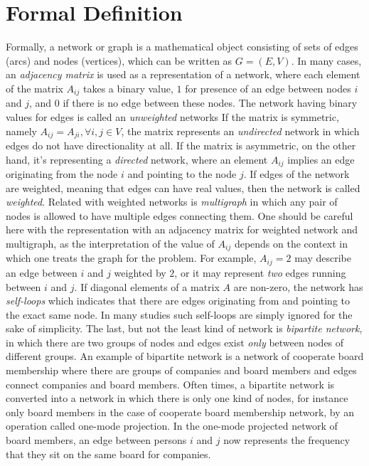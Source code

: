 \section*{Formal Definition}
	Formally, a network or graph is a mathematical object consisting of sets of edges (arcs) and nodes (vertices), which can be written as $G = (E,V)$. In many cases, an \textit{adjacency matrix} is used as a representation of a network, where each element of the matrix $A_{ij}$ takes a binary value, $1$ for presence of an edge between nodes $i$ and $j$, and $0$ if there is no edge between these nodes. The network having binary values for edges is called an \textit{unweighted} networks  If the matrix is symmetric, namely $A_{ij} = A_{ji},  \forall i,j \in V$, the matrix represents an \textit{undirected} network in which edges do not have directionality at all. If the matrix is asymmetric, on the other hand, it's representing a \textit{directed} network, where an element $A_{ij}$ implies an edge originating from the node $i$ and pointing to the node $j$. If edges of the network are weighted, meaning that edges can have real values, then the network is called \textit{weighted}. Related with weighted networks is \textit{multigraph} in which any pair of nodes is allowed to have multiple edges connecting them. One should be careful here with the representation with an adjacency matrix for weighted network and multigraph, as the interpretation of the value of $A_{ij}$ depends on the context in which one treats the graph for the problem. For example, $A_{ij} = 2$ may describe an edge between $i$ and $j$ weighted by $2$, or it may represent \textit{two} edges running between $i$ and $j$. If diagonal elements of a matrix $A$ are non-zero, the network has \textit{self-loops} which indicates that there are edges originating from and pointing to the exact same node. In many studies such self-loops are simply ignored for the sake of simplicity. The last, but not the least kind of network is \textit{bipartite network}, in which there are two groups of nodes and edges exist \textit{only} between nodes of different groups. An example of bipartite network is a network of cooperate board membership where there are groups of companies and board members and edges connect companies and board members. Often times, a bipartite network is converted into a network in which there is only one kind of nodes, for instance only board members in the case of cooperate board membership network, by an operation called one-mode projection. In the one-mode projected network of board members, an edge between persons $i$ and $j$ now represents the frequency that they sit on the same board for companies.
	
